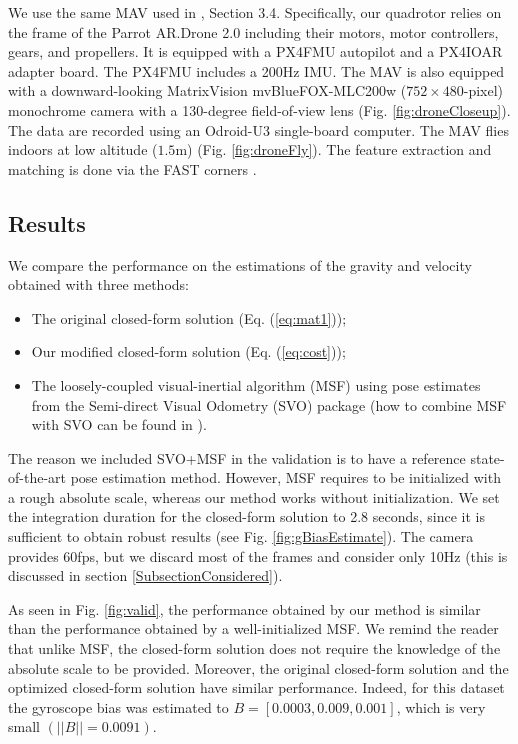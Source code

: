 \documentclass[letterpaper, 10pt, conference, final]{ieeeconf}  %
\begin{document}
We use the same MAV used in \cite{FaesslerICRA15}, Section 3.4.
Specifically, our quadrotor relies on the frame of the Parrot AR.Drone 2.0 including their motors, motor controllers, gears, and propellers.
It is equipped with a PX4FMU autopilot and a PX4IOAR adapter board.
The PX4FMU includes a 200Hz IMU.
The MAV is also equipped with a downward-looking MatrixVision mvBlueFOX-MLC200w ($752 \times 480$-pixel) monochrome camera with a 130-degree field-of-view lens (Fig. \ref{fig:droneCloseup}).
The data are recorded using an Odroid-U3 single-board computer.
The MAV flies indoors at low altitude ($1.5$m) (Fig. \ref{fig:droneFly}).
The feature extraction and matching is done via the FAST corners \cite{Rosten2005, Rosten2006}.

\subsection{Results}

We compare the performance on the estimations of the gravity and velocity obtained with three methods:
\begin{itemize}
\item The original closed-form solution \cite{Martinelli2014} (Eq. (\ref{eq:mat1}));
\item Our modified closed-form solution (Eq. (\ref{eq:cost}));
\item The loosely-coupled visual-inertial algorithm (MSF) \cite{LynenIROS13} using pose estimates from the Semi-direct Visual Odometry (SVO) package \cite{Forster2014} (how to combine MSF with SVO can be found in \cite{FaesslerICRA15}).
\end{itemize}
The reason we included SVO+MSF in the validation is to have a reference state-of-the-art pose estimation method.
However, MSF requires to be initialized with a rough absolute scale, whereas our method works without initialization.
We set the integration duration for the closed-form solution to 2.8 seconds, since it is sufficient to obtain robust results (see Fig. \ref{fig:gBiasEstimate}).
The camera provides 60fps, but we discard most of the frames and consider only 10Hz (this is discussed in section \ref{SubsectionConsidered}).

As seen in Fig. \ref{fig:valid}, the performance obtained by our method is similar than the performance obtained by a well-initialized MSF.
We remind the reader that unlike MSF, the closed-form solution does not require the knowledge of the absolute scale to be provided.
Moreover, the original closed-form solution and the optimized closed-form solution have similar performance.
Indeed, for this dataset the gyroscope bias was estimated to $B = [0.0003, 0.009, 0.001]$, which is very small $(||B|| = 0.0091)$.
\end{document}
